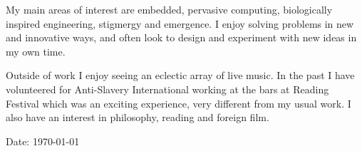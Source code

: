 \documentclass[overlapped,line,letterpaper]{res}
\begin{document}
\begin{resume}
My main areas of interest are embedded, pervasive computing, biologically
inspired engineering, stigmergy and emergence.
I enjoy solving problems in new and innovative ways, and often look to design and
experiment with new ideas in my own time.

Outside of work I enjoy seeing an eclectic array of live music. In the past I
have volunteered for Anti-Slavery International working at the bars at Reading
Festival which was an exciting experience, very different from my usual work.
I also have an interest in philosophy, reading and foreign film.


\begin{center}
{\tiny \rm $ $Date: \today $ $ }
\end{center}

\end{resume}
\end{document}
